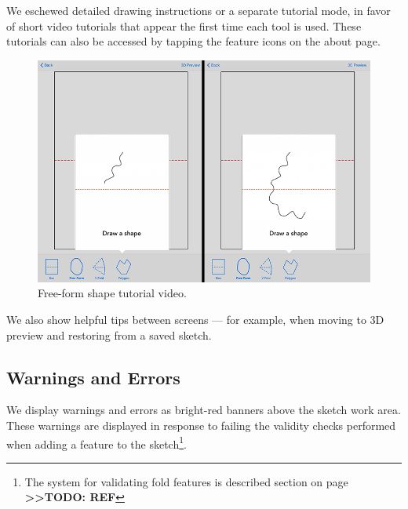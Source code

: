 We eschewed detailed drawing instructions or a separate tutorial mode,
in favor of short video tutorials that appear the first time each tool
is used. These tutorials can also be accessed by tapping the feature
icons on the about page.

\begin{figure}[htbp]
\centering
\includegraphics{figures/32_UI_Tool_Interactions/tutorial_step_one_two.png}
\caption{Free-form shape tutorial video.}
\end{figure}

We also show helpful tips between screens --- for example, when moving
to 3D preview and restoring from a saved sketch.

\subsection{Warnings and Errors}\label{warnings-and-errors}

We display warnings and errors as bright-red banners above the sketch
work area. These warnings are displayed in response to failing the
validity checks performed when adding a feature to the sketch\footnote{The
  system for validating fold features is described section on page
  \textbf{\textgreater{}\textgreater{}TODO: REF}}.


